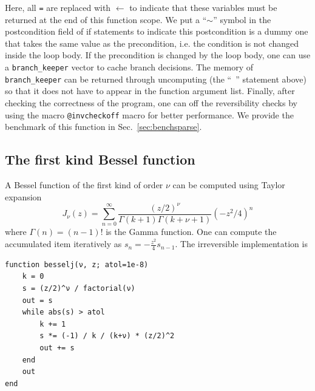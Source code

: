 \documentclass{article}
\newcommand{\<}{\langle}
\renewcommand{\>}{\rangle}
\newcommand{\Sec}[1]{Sec.~\ref{#1}}
\theoremstyle{definition}\newtheorem{definition}{\textit{Definition}}
\begin{document}
Here, all \texttt{=} are replaced with \texttt{$\leftarrow$} to indicate that these variables must be returned at the end of this function scope.
We put a ``\texttt{$\sim$}'' symbol in the postcondition field of if statements to indicate this postcondition is a dummy one that takes the same value as the precondition, i.e. the condition is not changed inside the loop body.
If the precondition is changed by the loop body, one can use a \texttt{branch\_keeper} vector to cache branch decisions. The memory of \texttt{branch\_keeper} can be returned through uncomputing (the ``~'' statement above) so that it does not have to appear in the function argument list.
Finally, after checking the correctness of the program, one can off the reversibility checks by using the macro \texttt{@invcheckoff} macro for better performance. We provide the benchmark of this function in \Sec{sec:benchsparse}.

\subsection{The first kind Bessel function}\label{sec:bessel}
A Bessel function of the first kind of order $\nu$ can be computed using Taylor expansion
\begin{equation}
    J_\nu(z) = \sum\limits_{n=0}^{\infty} \frac{(z/2)^\nu}{\Gamma(k+1)\Gamma(k+\nu+1)} (-z^2/4)^{n}
\end{equation}
where $\Gamma(n) = (n-1)!$ is the Gamma function. One can compute the accumulated item iteratively as $s_n = -\frac{z^2}{4} s_{n-1}$. The irreversible implementation is

\begin{minipage}{.88\columnwidth}
\begin{lstlisting}
function besselj(ν, z; atol=1e-8)
    k = 0
    s = (z/2)^ν / factorial(ν)
    out = s
    while abs(s) > atol
        k += 1
        s *= (-1) / k / (k+ν) * (z/2)^2
        out += s
    end
    out
end
\end{lstlisting}
\end{minipage}
\end{document}
